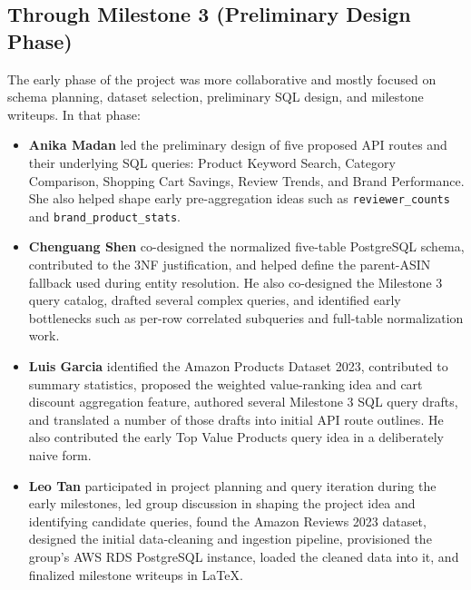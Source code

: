 \documentclass[10pt]{article}
\begin{document}
\subsection*{Through Milestone 3 (Preliminary Design Phase)}
The early phase of the project was more collaborative and mostly focused on
schema planning, dataset selection, preliminary SQL design, and milestone
writeups. In that phase:
\begin{itemize}
  \item \textbf{Anika Madan} led the preliminary design of five proposed API
  routes and their underlying SQL queries: Product Keyword Search, Category
  Comparison, Shopping Cart Savings, Review Trends, and Brand Performance. She
  also helped shape early pre-aggregation ideas such as
  \texttt{reviewer\_counts} and \texttt{brand\_product\_stats}.
  \item \textbf{Chenguang Shen} co-designed the normalized five-table
  PostgreSQL schema, contributed to the 3NF justification, and helped define
  the parent-ASIN fallback used during entity resolution. He also co-designed
  the Milestone 3 query catalog, drafted several complex queries, and
  identified early bottlenecks such as per-row correlated subqueries and
  full-table normalization work.
  \item \textbf{Luis Garcia} identified the Amazon Products Dataset 2023,
  contributed to summary statistics, proposed the weighted value-ranking idea
  and cart discount aggregation feature, authored several Milestone 3 SQL query
  drafts, and translated a number of those drafts into initial API route
  outlines. He also contributed the early Top Value Products query idea in a
  deliberately naive form.
  \item \textbf{Leo Tan} participated in project planning and query iteration
  during the early milestones, led group discussion in shaping the project
  idea and identifying candidate queries, found the Amazon Reviews 2023
  dataset, designed the initial data-cleaning and ingestion pipeline,
  provisioned the group's AWS RDS PostgreSQL instance, loaded the cleaned data
  into it, and finalized milestone writeups in \LaTeX.
\end{itemize}
\end{document}

